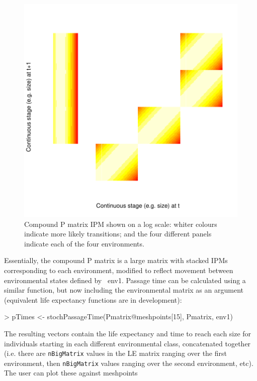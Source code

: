 \documentclass{article}
\begin{document}
\begin{figure}
\begin{center}
\includegraphics{IPMpack_Vignette-figCompound}
\end{center}
\caption{Compound P matrix IPM shown on a log scale: whiter colours indicate
  more likely transitions; and the four different panels indicate each
  of the four environments.}
\label{fig:compound}
\end{figure}
Essentially, the compound P matrix is a large matrix with stacked IPMs
corresponding to each environment, modified to reflect movement
between environmental states defined by {\ env1}. Passage time can be
calculated using a similar function, but now including the environmental
matrix as an argument (equivalent life expectancy functions are in development): 
\begin{Schunk}
\begin{Sinput}
> pTimes <- stochPassageTime(Pmatrix@meshpoints[15], Pmatrix, env1)
\end{Sinput}
\end{Schunk}
The resulting vectors contain the life expectancy and time to reach each size for individuals starting in each different environmental class, concatenated together (i.e. there are {\tt nBigMatrix} values in the LE matrix ranging over the first environment, then {\tt nBigMatrix} values ranging over the second environment, etc). The user can plot these against meshpoints 
\end{document}
